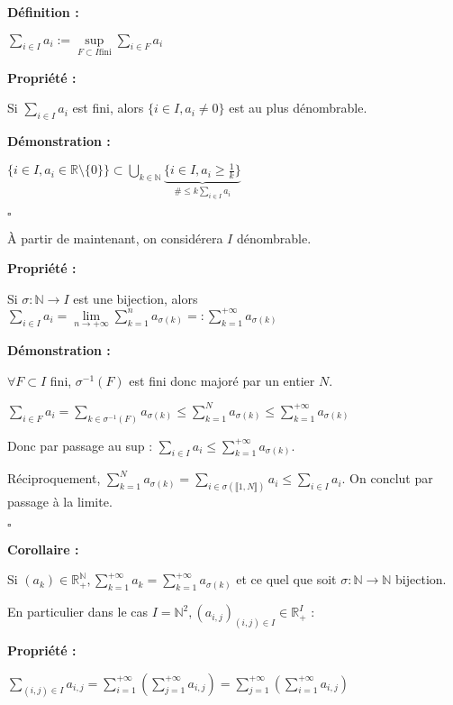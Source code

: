 \documentclass[10pt,a4paper,notitlepage ]{report}
\newenvironment{definition}{
	
	\textbf{Définition : }
}
{}
\newcounter{th}
\newenvironment{propriete}[1][]{
	\begin{tcolorbox}
		\textbf{Propriété #1 : }
}
{\end{tcolorbox}}
\newenvironment{demo}[1][]{

	\textbf{Démonstration #1 :}
}{\begin{flushright}
	$\square$
\end{flushright}
}
\newenvironment{corollaire}{
	\begin{tcolorbox}
		\textbf{Corollaire : }
	}
	{\end{tcolorbox}}
\begin{document}
\begin{definition}
	$\sum_{i \in I} a_i := \underset{F \subset I \mathrm{fini}}{\sup}\sum_{i \in F}a_i$
\end{definition}
\begin{propriete}
	Si $\sum_{i \in I} a_i$ est fini, alors $\{i \in I, a_i\neq 0\}$ est au plus dénombrable.
\end{propriete}

\begin{demo}
	$\{i\in I, a_i \in \mathbb R \setminus \{0\}\} \subset \underset{k \in \mathbb N}{\bigcup}
	\underset{\# \le k\sum_{i\in I} a_i}{\underbrace{\{i \in I, a_i \ge \frac{1}{k}\}}}$
\end{demo}

À partir de maintenant, on considérera $I$ dénombrable.

\begin{propriete}
	Si $\sigma : \mathbb N \rightarrow I$ est une bijection, alors
	$\sum_{i\in I}a_i = \underset{n \rightarrow +\infty}{\lim}\sum_{k=1}^{n}a_{\sigma (k)} =: \sum_{k=1}^{+\infty}a_{\sigma(k)}$
\end{propriete}

\begin{demo}
	$\forall F \subset I$ fini, $\sigma ^{-1}(F)$ est fini donc majoré par un entier $N$.
	
	$\sum_{i\in F}a_i = \sum_{k\in \sigma^{-1}(F)}a_{\sigma(k)} \le \sum_{k=1}^N a_{\sigma(k)} \le \sum_{k=1}^{+\infty}a_{\sigma(k)}$
	
	Donc par passage au sup : $\sum_{i\in I} a_i \le \sum_{k=1}^{+\infty}a_{\sigma(k)}$.
	
	Réciproquement, $\sum_{k=1}^N a_{\sigma(k)} = \sum_{i\in\sigma(\llbracket 1,N \rrbracket)} a_i \le \sum_{i\in I}a_i$. On conclut par passage à la limite.
\end{demo}

\begin{corollaire}
	Si $(a_k) \in \mathbb R_+^{\mathbb N}, \sum_{k=1}^{+\infty}a_k=\sum_{k=1}^{+\infty}a_{\sigma(k)}$ et ce quel que soit $\sigma : \mathbb N \rightarrow \mathbb N$ bijection.
\end{corollaire}

En particulier dans le cas $I=\mathbb N^2, (a_{i,j})_{(i,j)\in I}\in \mathbb R_+^I$ :
\begin{propriete}
	$\sum_{(i,j)\in I}a_{i,j} = \sum_{i=1}^{+\infty}\left(\sum_{j=1}^{+\infty}a_{i,j}\right) =
	\sum_{j=1}^{+\infty}\left(\sum_{i=1}^{+\infty}a_{i,j}\right)$
\end{propriete}
\end{document}
